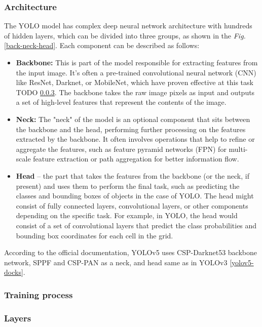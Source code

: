 \documentclass[14pt,a4paper]{extarticle}
\newcounter{e}
\numberwithin{equation}{section}
\numberwithin{figure}{section}
\begin{document}
\subsubsection{Architecture}
The YOLO model has complex deep neural network architecture with hundreds of hidden layers, which can be divided into three groups, as shown in the \textit{Fig.} \ref{back-neck-head}. Each component can be described as follows:

\begin{itemize}
    \item \textbf{Backbone:} This is part of the model responsible for extracting features from the input image. It's often a pre-trained convolutional neural network (CNN) like ResNet, Darknet, or MobileNet, which have proven effective at this task TODO \ref{}. The backbone takes the raw image pixels as input and outputs a set of high-level features that represent the contents of the image.
    \item \textbf{Neck:} The "neck" of the model is an optional component that sits between the backbone and the head, performing further processing on the features extracted by the backbone. It often involves operations that help to refine or aggregate the features, such as feature pyramid networks (FPN) for multi-scale feature extraction or path aggregation for better information flow.
    \item \textbf{Head} -- the part that takes the features from the backbone (or the neck, if present) and uses them to perform the final task, such as predicting the classes and bounding boxes of objects in the case of YOLO. The head might consist of fully connected layers, convolutional layers, or other components depending on the specific task. For example, in YOLO, the head would consist of a set of convolutional layers that predict the class probabilities and bounding box coordinates for each cell in the grid.
\end{itemize}

According to the official documentation, YOLOv5 uses CSP-Darknet53 backbone network, SPPF and CSP-PAN as a neck, and head same as in YOLOv3 \ref{yolov5-docks}.
    
\subsubsection{Training process}

\subsubsection{Layers}
\end{document}
